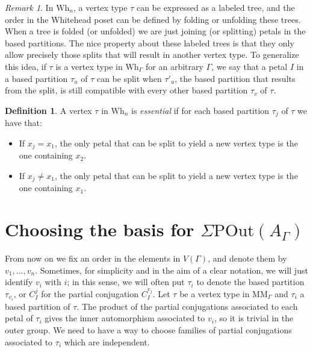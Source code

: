 \documentclass[a4paper]{amsart}
\newcommand{\G}{\Gamma}
\newcommand{\A}{{A_\Gamma}}
\newcommand{\POut}{\Sigma\mathrm{POut}}
\newcommand{\Wh}{\mathrm{Wh}}
\theoremstyle{definition}
\newtheorem{defi}[teo]{Definition}
\theoremstyle{remark}
\newtheorem*{nota}{Remark}
\begin{document}
\begin{nota}
    In $\Wh_n$, a vertex type $\tau$ can be expressed as a labeled tree, and the order in the Whitehead poset can be defined by folding or unfolding these trees. When a tree is folded (or unfolded) we are just joining (or splitting) petals in the based partitions. The nice property about these labeled trees is that they only allow precisely those splits that will result in another vertex type. To generalize this idea, if $\tau$ is a vertex type in $\Wh_\G$ for an arbitrary $\G$, we say that a petal $I$ in a based partition $\tau_u$ of $\tau$ can be split when $\tau'_u$, the  based partition that results from the split,   is still compatible with every other based partition $\tau_v$ of $\tau$.
\end{nota}
 \newpage
\begin{defi}
    A vertex $\tau$ in $\Wh_n$ is \textit{essential} if for each based partition $\tau_j$ of $\tau$ we have that:
    \begin{itemize}
        \item[1)] If $x_j=x_1$, the only petal that  can be split to yield a new vertex type is the one containing $x_2$.
        \item[2)] If $x_j\neq x_1$, the only petal that can be split to yield a new vertex type  is the one containing $x_1$.
    \end{itemize}
\end{defi}





\section{Choosing the basis for $\POut(\A)$}\label{sec:basis}

From now on we fix an  order in the elements in $V(\G)$, and denote them by $v_1,...,v_n$. Sometimes, for simplicity and in the aim of a clear notation, we will just identify $v_i$ with $i$; in this sense, we will often put $\tau_i$ to denote the based partition $\tau_{v_i}$, or $C^j_I$ for the partial conjugation $C^{v_j}_I$.
Let $\tau$ be a vertex type in MM$_\G$ and $\tau_i$ a based partition of $\tau$. The product of the partial conjugations associated to each petal of $\tau_i$ gives the inner automorphism associated to $v_i$, so it is trivial in the outer group. We need to have a way to choose families of partial conjugations  associated to  $\tau_i$ which are independent.
\end{document}
